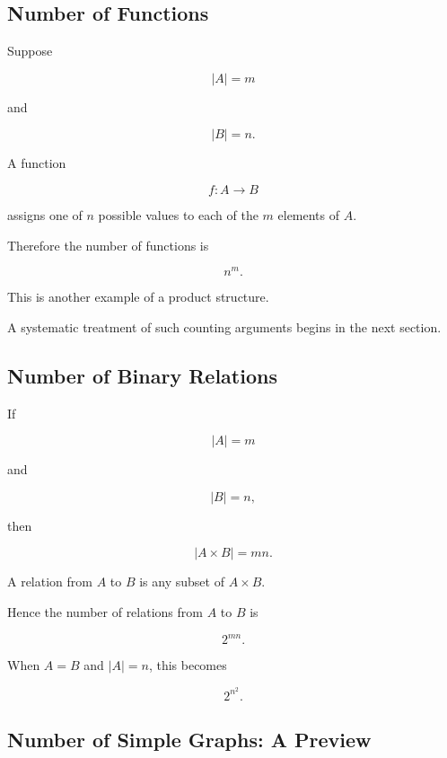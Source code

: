 \subsection{Number of Functions}
\label{subsec:number-functions-preview}

Suppose

\[
|A|=m
\]

and

\[
|B|=n.
\]

A function

\[
f:A\to B
\]

assigns one of \(n\) possible values to each of the \(m\) elements of
\(A\).

Therefore the number of functions is

\[
\boxed{
n^m.
}
\]

This is another example of a product structure.

A systematic treatment of such counting arguments begins in the next
section.

\subsection{Number of Binary Relations}
\label{subsec:number-binary-relations}

If

\[
|A|=m
\]

and

\[
|B|=n,
\]

then

\[
|A\times B|=mn.
\]

A relation from \(A\) to \(B\) is any subset of \(A\times B\).

Hence the number of relations from \(A\) to \(B\) is

\[
\boxed{
2^{mn}.
}
\]

When \(A=B\) and \(|A|=n\), this becomes

\[
\boxed{
2^{n^2}.
}
\]

\subsection{Number of Simple Graphs: A Preview}
\label{subsec:number-simple-graphs-preview}

